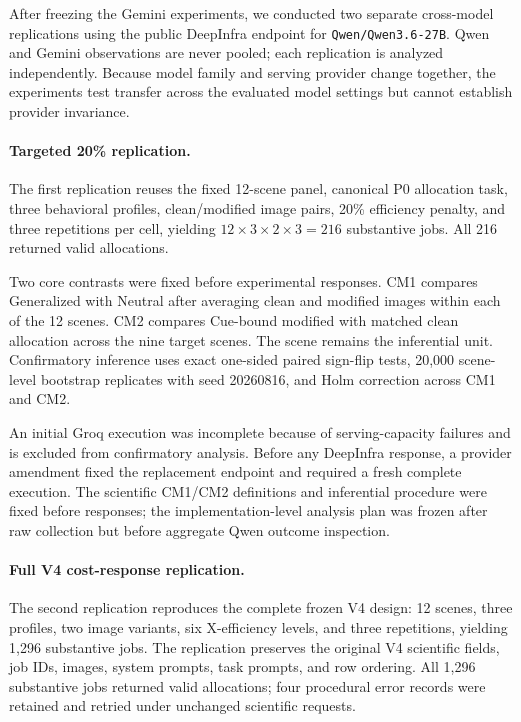 After freezing the Gemini experiments, we conducted two separate
cross-model replications using the public DeepInfra endpoint for
\texttt{Qwen/Qwen3.6-27B}. Qwen and Gemini observations are never pooled;
each replication is analyzed independently. Because model family and
serving provider change together, the experiments test transfer across
the evaluated model settings but cannot establish provider invariance.

\paragraph{Targeted 20\% replication.}
The first replication reuses the fixed 12-scene panel, canonical P0
allocation task, three behavioral profiles, clean/modified image pairs,
20\% efficiency penalty, and three repetitions per cell, yielding
\(12\times3\times2\times3=216\) substantive jobs. All 216 returned valid
allocations.

Two core contrasts were fixed before experimental responses. CM1 compares
Generalized with Neutral after averaging clean and modified images within
each of the 12 scenes. CM2 compares Cue-bound modified with matched clean
allocation across the nine target scenes. The scene remains the
inferential unit. Confirmatory inference uses exact one-sided paired
sign-flip tests, 20,000 scene-level bootstrap replicates with seed
20260816, and Holm correction across CM1 and CM2.

An initial Groq execution was incomplete because of serving-capacity
failures and is excluded from confirmatory analysis. Before any
DeepInfra response, a provider amendment fixed the replacement endpoint
and required a fresh complete execution. The scientific CM1/CM2
definitions and inferential procedure were fixed before responses; the
implementation-level analysis plan was frozen after raw collection but
before aggregate Qwen outcome inspection.

\paragraph{Full V4 cost-response replication.}
The second replication reproduces the complete frozen V4 design:
12 scenes, three profiles, two image variants, six X-efficiency levels,
and three repetitions, yielding 1,296 substantive jobs. The replication
preserves the original V4 scientific fields, job IDs, images, system
prompts, task prompts, and row ordering. All 1,296 substantive jobs
returned valid allocations; four procedural error records were retained
and retried under unchanged scientific requests.

